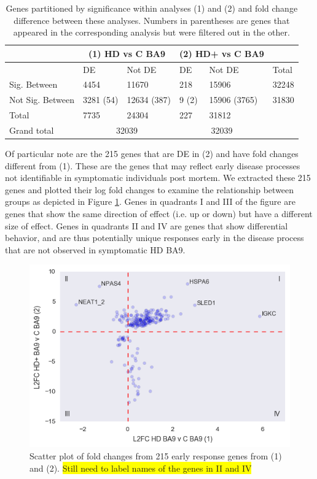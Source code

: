 \documentclass[fleqn,10pt,table]{wlscirep}
\newcommand{\todo}[1]{\colorbox{yellow}{#1}}
\begin{document}
\begin{table}[ht]
\centering
{}
\begin{tabular}{|l|l|l|l|l|l|} \hline
                 & \multicolumn{2}{c|}{(1) HD vs C BA9} & \multicolumn{2}{c|}{(2) HD+ vs C BA9} &\\\hline
                 & DE               & Not DE            & DE               & Not DE           & Total \\\hline
Sig. Between     & 4454 & 11670 & 218 & 15906         & 32248 \\\hline
Not Sig. Between & 3281 (54) & 12634 (387) & 9 (2) & 15906 (3765) & 31830 \\\hline
Total            & 7735 & 24304 & 227 & 31812         & \\\hline
Grand total      & \multicolumn{2}{c|}{32039}   & \multicolumn{2}{c|}{32039}               & \\\hline
\end{tabular}
\caption{Genes partitioned by significance within analyses (1) and (2) and fold change difference between these analyses. Numbers in parentheses are genes that appeared in the corresponding analysis but were filtered out in the other. \label{tab:hd+-vs-hd}}
\end{table}

Of particular note are the 215 genes that are DE in (2) and have fold changes different from (1).
These are the genes that may reflect early disease processes not identifiable in symptomatic individuals post mortem.
We extracted these 215 genes and plotted their log fold changes to examine the relationship between groups as depicted in Figure \ref{fig:early_genes}.
Genes in quadrants I and III of the figure are genes that show the same direction of effect (i.e. up or down) but have a different size of effect.
Genes in quadrants II and IV are genes that show differential behavior, and are thus potentially unique responses early in the disease process that are not observed in symptomatic HD BA9.

\begin{figure}[ht]
\centering
\includegraphics[width=0.5\linewidth]{fig5.png}
\caption{Scatter plot of fold changes from 215 early response genes from (1) and (2). \todo{Still need to label names of the genes in II and IV} \label{fig:early_genes}}
\end{figure}
\end{document}
